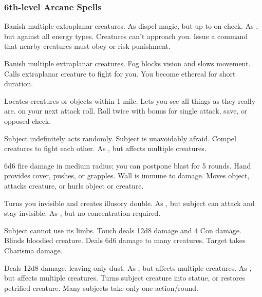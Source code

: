 \subsubsection{6th-level Arcane Spells} 
\begin{swspelllist}
   Banish multiple extraplanar creatures. 
   As dispel magic, but up to  on check.
   As , but against all energy types.
   Creatures can't approach you.
   Issue a command that nearby creatures must obey or risk punishment.

   Banish multiple extraplanar creatures. 
   Fog blocks vision and slows movement.
   Calls extraplanar creature to fight for you.
   You become ethereal for short duration.

   Locates creatures or objects within 1 mile.
  \M Lets you see all things as they really are.
    on your next attack roll.
   Roll twice with bonus for single attack, save, or opposed check.

   Subject indefinitely acts randomly.
   Subject is unavoidably afraid.
   Compel creatures to fight each other.
   As , but affects multiple creatures.

   6d6 fire damage in medium radius; you can postpone blast for 5 rounds.
   Hand provides cover, pushes, or grapples.
   Wall is immune to damage.
   Moves object, attacks creature, or hurls object or creature.

   Turns you invisible and creates illusory double.
   As , but subject can attack and stay invisible.
   As , but no concentration required.

   Subject cannot use its limbs. 
   Touch deals 12d8 damage and 4 Con damage.
   Blinds bloodied creature.
   Deals 6d6 damage to many creatures.
   Target takes Charisma damage.

   Deals 12d8 damage, leaving only dust.
   As , but affects multiple creatures.
   As , but affects multiple creatures.
   Turns subject creature into statue, or restores petrified creature.
   Many subjects take only one action/round.
\end{swspelllist}

